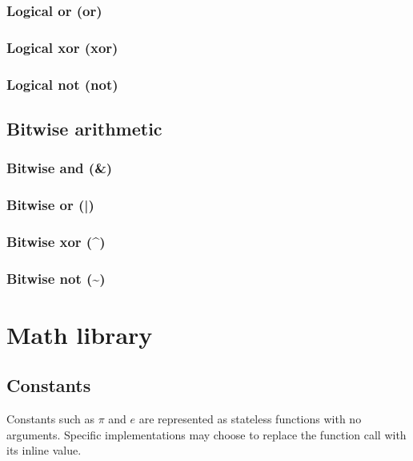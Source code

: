\documentclass{article}
\theoremstyle{definition}
\begin{document}
\subsubsection{Logical or (or)}

\subsubsection{Logical xor (xor)}

\subsubsection{Logical not (not)}

\subsection{Bitwise arithmetic}

\subsubsection{Bitwise and (\&)}
\libfcn{\&}

\subsubsection{Bitwise or (|)}
\libfcn{|}

\subsubsection{Bitwise xor (\^{})}
\libfcn{\^{}}

\subsubsection{Bitwise not (\textasciitilde{})}

\pagebreak

\section{Math library}

\subsection{Constants}

Constants such as $\pi$ and $e$ are represented as stateless functions with no arguments.  Specific implementations may choose to replace the function call with its inline value.
\end{document}
